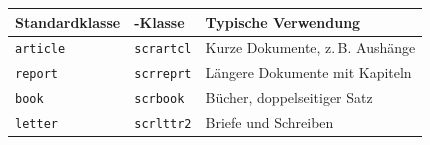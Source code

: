 \begin{center}
	\begin{tabularx}{\linewidth}{llX}
		\toprule
		\textbf{Standardklasse} & \textbf{\KOMAScript{}-Klasse} & \textbf{Typische Verwendung}          \\
		\midrule
		\texttt{article}        & \texttt{scrartcl}             & Kurze Dokumente, z.\,B. Aushänge      \\
		\texttt{report}         & \texttt{scrreprt}             & Längere Dokumente mit Kapiteln        \\
		\texttt{book}           & \texttt{scrbook}              & Bücher, doppelseitiger Satz           \\
		\texttt{letter}         & \texttt{scrlttr2}             & Briefe und Schreiben                  \\
		\bottomrule
	\end{tabularx}
\end{center}
